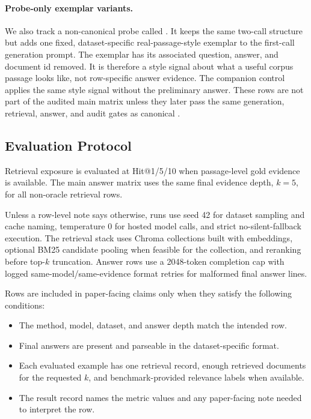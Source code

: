 \paragraph{Probe-only exemplar variants.}
We also track a non-canonical probe called . It keeps
the same two-call \hyre{} structure but adds one fixed, dataset-specific
real-passage-style exemplar to the first-call generation prompt. The exemplar
has its associated question, answer, and document id removed. It is therefore a
style signal about what a useful corpus passage looks like, not row-specific
answer evidence. The companion  control applies the
same style signal without the preliminary answer. These rows are not part of the
audited main matrix unless they later pass the same generation, retrieval,
answer, and audit gates as canonical \hyre{}.

\subsection{Evaluation Protocol}

Retrieval exposure is evaluated at Hit@1/5/10 when passage-level gold evidence
is available. The main answer matrix uses the same final evidence depth,
$k=5$, for all non-oracle retrieval rows.

Unless a row-level note says otherwise, runs use seed 42 for dataset sampling
and cache naming, temperature 0 for hosted model calls, and strict
no-silent-fallback execution. The retrieval stack uses Chroma collections built
with  embeddings, optional BM25 candidate
pooling when feasible for the collection, and
 reranking before top-$k$
truncation. Answer rows use a 2048-token completion cap with logged
same-model/same-evidence format retries for malformed final answer lines.

Rows are included in paper-facing claims only when they satisfy the following
conditions:

\begin{itemize}[leftmargin=*]
\item The method, model, dataset, and answer depth match the intended row.
\item Final answers are present and parseable in the dataset-specific format.
\item Each evaluated example has one retrieval record, enough retrieved documents
for the requested $k$, and benchmark-provided relevance labels when available.
\item The result record names the metric values and any paper-facing note needed
to interpret the row.
\end{itemize}


